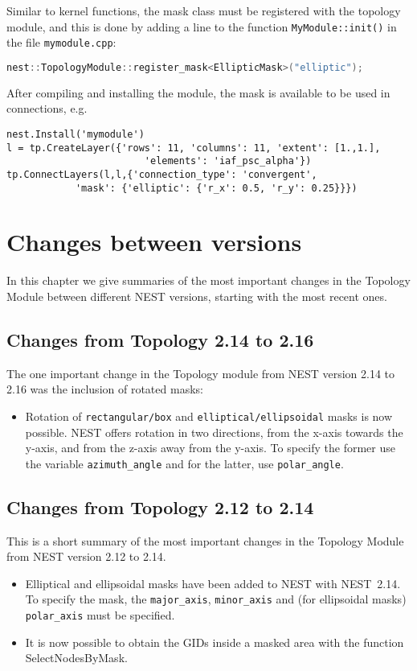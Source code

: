 \documentclass[a4paper,12pt]{report}
\begin{document}
Similar to kernel functions, the mask class must be registered with the
topology module, and this is done by adding a line to the function
\lstinline!MyModule::init()! in the file \lstinline!mymodule.cpp!:
\begin{lstlisting}[language=C++]
    nest::TopologyModule::register_mask<EllipticMask>("elliptic");
\end{lstlisting}
After compiling and installing the module, the mask is available to be used
in connections, e.g.
\begin{lstlisting}
nest.Install('mymodule')
l = tp.CreateLayer({'rows': 11, 'columns': 11, 'extent': [1.,1.],
                        'elements': 'iaf_psc_alpha'})
tp.ConnectLayers(l,l,{'connection_type': 'convergent',
            'mask': {'elliptic': {'r_x': 0.5, 'r_y': 0.25}}})
\end{lstlisting}


\chapter{Changes between versions}\label{sec:changes}
In this chapter we give summaries of the most important changes in the
Topology Module between different NEST versions, starting with the most recent
ones.


\section{Changes from Topology 2.14 to 2.16}

The one important change in the Topology module from NEST version 2.14 to 2.16 
was the inclusion of rotated masks:
\begin{itemize}
  \item Rotation of \lstinline!rectangular/box! and
    \lstinline!elliptical/ellipsoidal! masks is now possible. NEST offers
    rotation in two directions, from the x-axis towards the y-axis, and from
    the z-axis away from the y-axis. To specify the former use the variable
    \lstinline!azimuth_angle! and for the latter, use \lstinline!polar_angle!.
\end{itemize}


\section{Changes from Topology 2.12 to 2.14}

This is a short summary of the most important changes in the Topology
Module from NEST version 2.12 to 2.14.
\begin{itemize}
  \item Elliptical and ellipsoidal masks have been added to NEST with NEST~2.14.
    To specify the mask, the \lstinline!major_axis!, \lstinline!minor_axis!
    and (for ellipsoidal masks) \lstinline!polar_axis! must be specified.
  \item It is now possible to obtain the GIDs inside a masked area
    with the function SelectNodesByMask.
\end{itemize}
\end{document}
